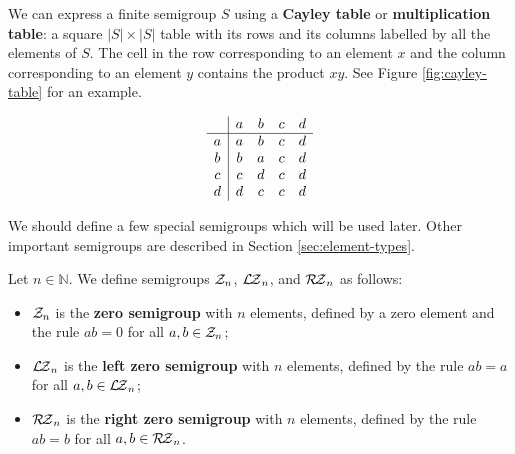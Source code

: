 \begin{definition}
  \label{def:cayley-table}
  We can express a finite semigroup $S$ using a \textbf{Cayley table} or
  \textbf{multiplication table}: a square $|S| \times |S|$ table with its rows
  and its columns labelled by all the elements of $S$.  The cell in the row
  corresponding to an element $x$ and the column corresponding to an element $y$
  contains the product $xy$.  See Figure \ref{fig:cayley-table} for an example.

  \begin{table}[ht]
    \centering
    \renewcommand\arraystretch{1.2}
    $$
    \begin{array}{c | c c c c}
      & a & b & c & d \\
      \hline
      a & a & b & c & d \\
      b & b & a & c & d \\
      c & c & d & c & d \\
      d & d & c & c & d \\
    \end{array}
    $$
    \renewcommand\arraystretch{0.7}
    \caption{Cayley table of a semigroup with four elements}
    \label{fig:cayley-table}
  \end{table}
\end{definition}

We should define a few special semigroups which will be used later.  Other
important semigroups are described in Section \ref{sec:element-types}.

\begin{definition}
  \label{def:zn}
  Let $n \in \mathbb{N}$.  We define semigroups $\mathcal{Z}_n$, $\mathcal{L\!Z}_n$, and $\mathcal{R\!Z}_n$ as
  follows:
  \begin{itemize}
  \item $\mathcal{Z}_n$ is the \textbf{zero semigroup} with $n$ elements, defined by a
    zero element and the rule $ab=0$ for all $a,b \in \mathcal{Z}_n$;
  \item $\mathcal{L\!Z}_n$ is the \textbf{left zero semigroup} with $n$ elements, defined
    by the rule $ab=a$ for all $a,b \in \mathcal{L\!Z}_n$;
  \item $\mathcal{R\!Z}_n$ is the \textbf{right zero semigroup} with $n$ elements, defined
    by the rule $ab=b$ for all $a,b \in \mathcal{R\!Z}_n$.
  \end{itemize}
\end{definition}

